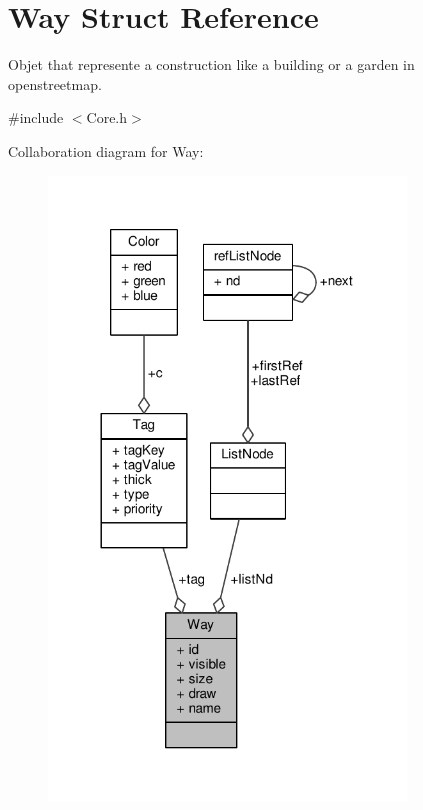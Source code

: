 \hypertarget{structWay}{\section{Way Struct Reference}
\label{structWay}
}


Objet that represente a construction like a building or a garden in openstreetmap.  




{\ttfamily \#include $<$Core.\-h$>$}



Collaboration diagram for Way\-:
\nopagebreak
\begin{figure}[H]
\begin{center}
\leavevmode
\includegraphics[width=269pt]{structWay__coll__graph}
\end{center}
\end{figure}
